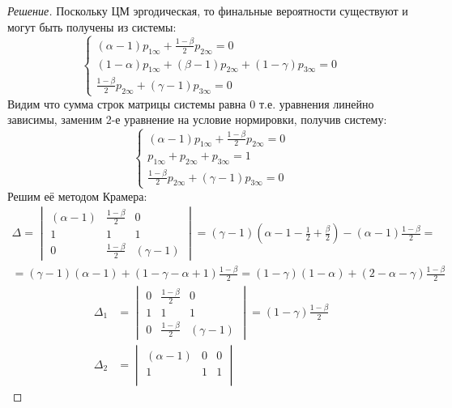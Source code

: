 \documentclass[12pt,a4paper]{article}
\begin{document}
\begin{proof}[Решение]
	Поскольку ЦМ эргодическая, то финальные вероятности существуют и могут быть получены из системы:
	\begin{equation*}
		\begin{cases} 
		(\alpha - 1) p_{1\infty} + \frac{1-\beta}{2}  p_{2 \infty} = 0 \\ 
		(1 - \alpha) p_{1\infty} + (\beta - 1) p_{2\infty} + (1 - \gamma) p_{3 \infty} = 0 \\ 
		\frac{1-\beta}{2} p_{2\infty} + (\gamma - 1) p_{3 \infty} = 0
		\end{cases}
	\end{equation*}
	Видим что сумма строк матрицы системы равна 0 т.е. уравнения линейно зависимы, заменим 2-е уравнение на условие нормировки, получив систему:
	\begin{equation*}
		\begin{cases} 
		(\alpha - 1) p_{1\infty} + \frac{1-\beta}{2}  p_{2 \infty} = 0 \\ 
		p_{1\infty} + p_{2\infty} + p_{3\infty} = 1 \\
		\frac{1-\beta}{2} p_{2\infty} + (\gamma - 1) p_{3 \infty} = 0
		\end{cases}
	\end{equation*}
	Решим её методом Крамера:
	\begin{multline*}
		\Delta = \begin{vmatrix}
			(\alpha - 1) & \frac{1-\beta}{2} & 0 \\
			1 & 1 & 1 \\
			0 & \frac{1-\beta}{2} & (\gamma - 1)
		\end{vmatrix} = (\gamma - 1)\left(\alpha - 1 - \frac{1}{2} + \frac{\beta}{2}\right) - (\alpha - 1)\frac{1-\beta}{2} = \\ = (\gamma - 1)(\alpha - 1) + (1 - \gamma - \alpha + 1)\frac{1-\beta}{2} = (1 - \gamma)(1 - \alpha) + (2 - \alpha - \gamma)\frac{1-\beta}{2}
	\end{multline*}
	\begin{align*}
		\Delta_1 &= \begin{vmatrix}
			0 & \frac{1-\beta}{2} & 0 \\
			1 & 1 & 1 \\
			0 & \frac{1-\beta}{2} & (\gamma - 1)
		\end{vmatrix} = (1 - \gamma)\frac{1-\beta}{2} \\
		\Delta_2 &= \begin{vmatrix}
		(\alpha - 1) & 0 & 0 \\
		1 & 1 & 1 \\ 

\end{vmatrix}
\end{align*}
\end{proof}
\end{document}
